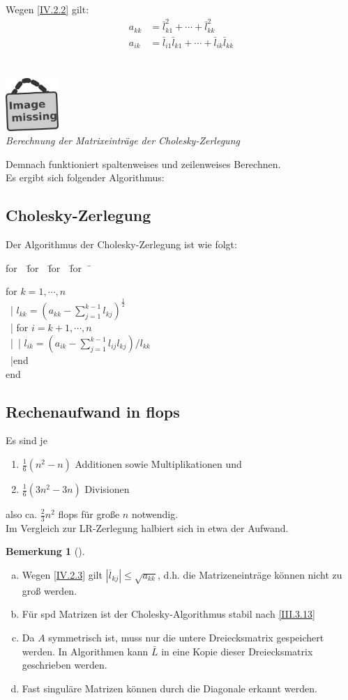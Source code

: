 \documentclass[ngerman,fontsize=11pt, paper=a4, parskip=half, titlepage=true, toc=bib]{scrbook}
\theoremstyle{definition}
\newtheorem{Bem}[Def]{Bemerkung}	%
\theoremstyle{plain}
\newcommand{\subsectione}[1]{\subsection{#1} \addtocounter{Def}{1}}
\newenvironment{Beme}[1][]{ %
	\begin{Bem}[#1]
	}
	{
	\end{Bem}
	\addtocounter{subsection}{1}
}
\newenvironment{pseudocode}[1]{ %
  \begin{minipage}{#1}
    \begin{framed}
      \hspace*{1em}	
      \begin{minipage}{#1}
        \begin{tabbing}
          for~~\= for~~\= for~~\= for~~\= \kill
	}
	{ %
        \end{tabbing}
      \end{minipage}
      \hspace*{1em}
    \end{framed}
  \end{minipage}
}
\newcommand{\imagemissing}[1]{
  \begin{center}~\\
    \centering 
    \includegraphics[width=2cm]{images/image_missing.jpg}\\
    \textit{#1} \\
  \end{center}
}
\begin{document}
  Wegen \eqref{IV.2.2} gilt: 
  \begin{align}
    a_{kk} &= \bar{l}_{k1}^{2} + \cdots +  \bar{l}_{kk}^2  \label{IV.2.3} \\
    a_{ik} &= \bar{l}_{i1} \bar{l}_{k1} + \cdots + \bar{l}_{ik} \bar{l}_{kk}  \label{IV.2.4} \\
  \end{align}
  \imagemissing{Berechnung der Matrixeinträge der Cholesky-Zerlegung}
  Demnach funktioniert spaltenweises und zeilenweises Berechnen. \\
  
  Es ergibt sich folgender Algorithmus:
  
  
  \subsectione{Cholesky-Zerlegung}
  Der Algorithmus der Cholesky-Zerlegung ist wie folgt:
  
  \begin{pseudocode}{0.55\linewidth}
    for  $k=1, \cdots , n$\\
    ~|\> $l_{kk} = (a_{kk}-\sum_{j=1}^{k-1}l_{kj})^{\frac{1}{2}}$ \\
    ~|\> for $i= k+1, \cdots , n$ \\
    ~|\>~|\> $l_{ik} = ( a_{ik}- \sum_{j=1}^{k-1}l_{ij} l_{kj})/{l_{kk}}$  \\
    ~|\>end\\
    end
  \end{pseudocode}
  
  
  
  \subsectione{Rechenaufwand in flops}
  Es sind je 
  \begin{enumerate}
  \item[] $\frac{1}{6}(n^2-n) $ Additionen sowie Multiplikationen und 
  \item[]  $\frac{1}{6}(3n^2-3n) $ Divisionen 
  \end{enumerate}
  also ca. $\frac{2}{3} n^2$ flops für große $n$ notwendig. \\
  Im Vergleich zur LR-Zerlegung halbiert sich in etwa der Aufwand.
  
\begin{Beme}~
	\begin{enumerate}[a)]
		\item Wegen \eqref{IV.2.3} gilt $|\overline{l}_{kj}| \leq \sqrt{a_{kk}}$,
		d.h. die Matrizeneinträge können nicht zu groß werden.
		\item Für spd Matrizen ist der Cholesky-Algorithmus stabil nach \eqref{III.3.13}
		\item Da $A$ symmetrisch ist, muss nur die untere Dreiecksmatrix gespeichert werden.
		In Algorithmen kann $\bar{L}$ in eine Kopie dieser Dreiecksmatrix geschrieben werden.
		\item Fast singuläre Matrizen können durch die Diagonale erkannt werden.
	\end{enumerate}
\end{Beme}
  
\end{document}
